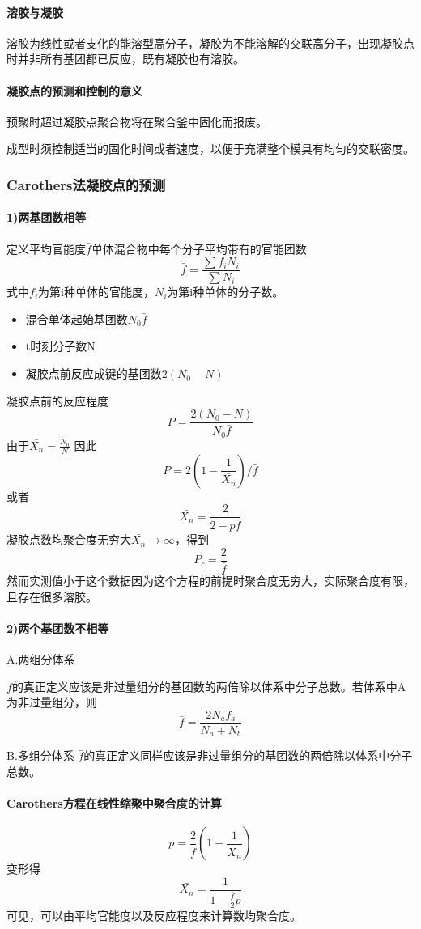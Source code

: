 ﻿\documentclass[12pt,a4paper]{article}
\begin{document}
\paragraph{溶胶与凝胶}溶胶为线性或者支化的能溶型高分子，凝胶为不能溶解的交联高分子，出现凝胶点时并非所有基团都已反应，既有凝胶也有溶胶。
\paragraph{凝胶点的预测和控制的意义}
预聚时超过凝胶点聚合物将在聚合釜中固化而报废。

成型时须控制适当的固化时间或者速度，以便于充满整个模具有均匀的交联密度。
\subsubsection{Carothers法凝胶点的预测}
\paragraph{1)两基团数相等}定义平均官能度$\bar{f }$单体混合物中每个分子平均带有的官能团数$$\bar{f}=\frac{\sum f_i N_i}{\sum N_i}$$式中$f_i$为第i种单体的官能度，$N_i$为第i种单体的分子数。

\begin{itemize}
  \item 混合单体起始基团数$N_0\bar{f}$
  \item t时刻分子数N
  \item 凝胶点前反应成键的基团数$2(N_0-N)$
\end{itemize}
 凝胶点前的反应程度$$P=\frac{2(N_0-N)}{N_0\bar{f}}$$由于$\bar{X_n}=\frac{N_0}{N}$
因此$$P=2(1-\frac{1}{\bar{X_n}})/\bar{f}$$或者$$\bar{X_n}=\frac{2}{2-p\bar{f}}$$凝胶点数均聚合度无穷大$\bar{X_n}\to \infty$，得到$$P_c=\frac{2}{\bar{f}}$$
然而实测值小于这个数据因为这个方程的前提时聚合度无穷大，实际聚合度有限，且存在很多溶胶。
\paragraph{2)两个基团数不相等}

A.两组分体系

$\bar{f}$的真正定义应该是非过量组分的基团数的两倍除以体系中分子总数。若体系中A为非过量组分，则$$\bar{f}=\frac{2N_af_a}{N_a+N_b}$$

B.多组分体系
$\bar{f}$的真正定义同样应该是非过量组分的基团数的两倍除以体系中分子总数。
\paragraph{Carothers方程在线性缩聚中聚合度的计算}
$$p=\frac{2}{\bar{f}}(1-\frac{1}{\bar{X_n}})$$变形得$$\bar{X_n}=\frac{1}{1-\frac{\bar{f}}{2}p}$$
可见，可以由平均官能度以及反应程度来计算数均聚合度。
\end{document}
